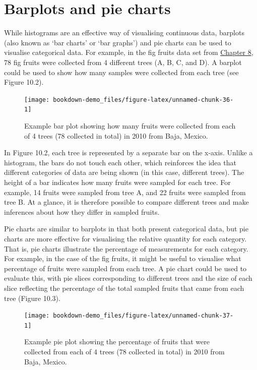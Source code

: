 \documentclass[
]{scrbook}
\begin{document}
\hypertarget{barplots-and-pie-charts}{%
\section{Barplots and pie charts}\label{barplots-and-pie-charts}}

While histograms are an effective way of visualising continuous data, barplots (also known as `bar charts' or `bar graphs') and pie charts can be used to visualise categorical data.
For example, in the fig fruits data set from \protect\hyperlink{Chapter_8}{Chapter 8}, 78 fig fruits were collected from 4 different trees (A, B, C, and D).
A barplot could be used to show how many samples were collected from each tree (see Figure 10.2).

\begin{figure}
\texttt{[image: bookdown-demo\_files/figure-latex/unnamed-chunk-36-1]} \caption{Example bar plot showing how many fruits were collected from each of 4 trees (78 collected in total) in 2010 from Baja, Mexico.}\label{fig:unnamed-chunk-36}
\end{figure}

In Figure 10.2, each tree is represented by a separate bar on the x-axis.
Unlike a histogram, the bars do not touch each other, which reinforces the idea that different categories of data are being shown (in this case, different trees).
The height of a bar indicates how many fruits were sampled for each tree.
For example, 14 fruits were sampled from tree A, and 22 fruits were sampled from tree B.
At a glance, it is therefore possible to compare different trees and make inferences about how they differ in sampled fruits.

Pie charts are similar to barplots in that both present categorical data, but pie charts are more effective for visualising the relative quantity for each category.
That is, pie charts illustrate the percentage of measurements for each category.
For example, in the case of the fig fruits, it might be useful to visualise what percentage of fruits were sampled from each tree.
A pie chart could be used to evaluate this, with pie slices corresponding to different trees and the size of each slice reflecting the percentage of the total sampled fruits that came from each tree (Figure 10.3).

\begin{figure}
\texttt{[image: bookdown-demo\_files/figure-latex/unnamed-chunk-37-1]} \caption{Example pie plot showing the percentage of fruits that were collected from each of 4 trees (78 collected in total) in 2010 from Baja, Mexico.}\label{fig:unnamed-chunk-37}
\end{figure}
\end{document}
